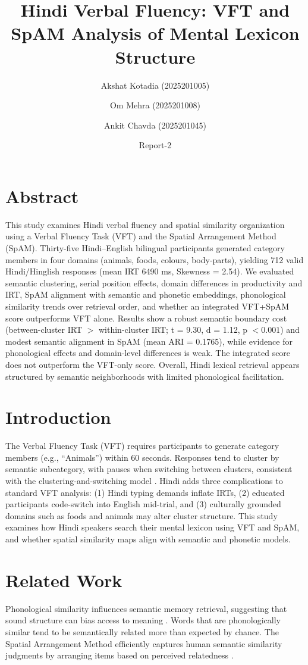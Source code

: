 \documentclass[12pt]{article}
\title{\textbf{Hindi Verbal Fluency: VFT and SpAM Analysis of Mental Lexicon Structure}}\author{Akshat Kotadia (2025201005) \and Om Mehra (2025201008) \and Ankit Chavda (2025201045)}
\date{Report-2}
\begin{document}
\maketitle

\section*{Abstract}
This study examines Hindi verbal fluency and spatial similarity organization using a Verbal Fluency Task (VFT) and the Spatial Arrangement Method (SpAM). Thirty-five Hindi--English bilingual participants generated category members in four domains (animals, foods, colours, body-parts), yielding 712 valid Hindi/Hinglish responses (mean IRT 6490 ms, Skewness = 2.54). We evaluated semantic clustering, serial position effects, domain differences in productivity and IRT, SpAM alignment with semantic and phonetic embeddings, phonological similarity trends over retrieval order, and whether an integrated VFT+SpAM score outperforms VFT alone. Results show a robust semantic boundary cost (between-cluster IRT $>$ within-cluster IRT; t = 9.30, d = 1.12, p $< 0.001$) and modest semantic alignment in SpAM (mean ARI = 0.1765), while evidence for phonological effects and domain-level differences is weak. The integrated score does not outperform the VFT-only score. Overall, Hindi lexical retrieval appears structured by semantic neighborhoods with limited phonological facilitation.

\section{Introduction}
The Verbal Fluency Task (VFT) requires participants to generate category members (e.g., ``Animals'') within 60 seconds. Responses tend to cluster by semantic subcategory, with pauses when switching between clusters, consistent with the clustering-and-switching model \citep{troyer1997}. Hindi adds three complications to standard VFT analysis: (1) Hindi typing demands inflate IRTs, (2) educated participants code-switch into English mid-trial, and (3) culturally grounded domains such as foods and animals may alter cluster structure. This study examines how Hindi speakers search their mental lexicon using VFT and SpAM, and whether spatial similarity maps align with semantic and phonetic models.

\section{Related Work}
Phonological similarity influences semantic memory retrieval, suggesting that sound structure can bias access to meaning \citep{dautriche2016}. Words that are phonologically similar tend to be semantically related more than expected by chance. The Spatial Arrangement Method efficiently captures human semantic similarity judgments by arranging items based on perceived relatedness \citep{hout2013}.
\end{document}

